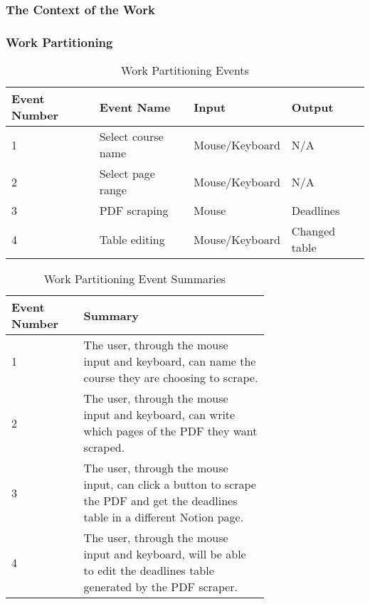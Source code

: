\documentclass[12pt, titlepage]{article}
\begin{document}
\subsubsection{The Context of the Work}

\pagebreak

\subsubsection{Work Partitioning}

\begin{table}[!ht]
  \begin{center}
    \begin{tabular}{|l|l|l|l|}
      \hline
      Event Number & Event Name         & Input          & Output          \\ \hline
      1            & Select course name & Mouse/Keyboard & N/A             \\ \hline
      2            & Select page range  & Mouse/Keyboard & N/A             \\ \hline
      3            & PDF scraping       & Mouse          & Deadlines       \\ \hline
      4            & Table editing      & Mouse/Keyboard & Changed table   \\ \hline
    \end{tabular}
    \caption{Work Partitioning Events}
  \end{center}
\end{table}


\begin{table}[!htp]
  \begin{center}
    \begin{tabular}{|l|p{0.72\linewidth}|}
      \hline
      Event Number & Summary                             \\ \hline
      1            & The user, through the mouse input and keyboard, can name the course they are choosing to scrape.                                \\ \hline
      2            & The user, through the mouse input and keyboard, can write which pages of the PDF they want scraped.                                 \\ \hline
      3            & The user, through the mouse input, can click a button to scrape the PDF and get the deadlines table in a different Notion page.    \\ \hline
      4            & The user, through the mouse input and keyboard, will be able to edit the deadlines table generated by the PDF scraper.      \\ \hline
      \end{tabular}
      \caption{Work Partitioning Event Summaries}
  \end{center}
\end{table}
\end{document}
